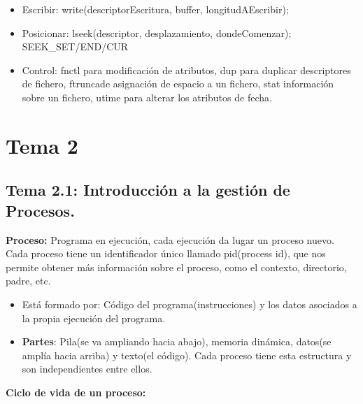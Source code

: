 \documentclass[12pt, twoside, openright]{report} %
\begin{document}
\begin{itemize}
\begin{itemize}
  \item Escribir: write(descriptorEscritura, buffer, longitudAEscribir);
    
  \item Posicionar: lseek(descriptor, desplazamiento, dondeComenzar);
    SEEK\_SET/END/CUR
    
  \item Control: fnctl para modificación de atributos, dup para duplicar
    descriptores de fichero, ftruncade asignación de espacio a un
    fichero, stat información sobre un fichero, utime para alterar los
    atributos de fecha.
    
  \end{itemize}
\end{itemize}

\chapter{Tema 2}
\section{Tema 2.1: Introducción a la gestión de Procesos.}

\textbf{Proceso:} Programa en ejecución, cada ejecución da lugar un
  proceso nuevo. Cada proceso tiene un identificador único llamado
  pid(process id), que nos permite obtener más información sobre el
  proceso, como el contexto, directorio, padre, etc.
  

  \begin{itemize}
  \item Está formado por: Código del programa(instrucciones) y los datos
    asociados a la propia ejecución del programa.
    
  \item \textbf{Partes}: Pila(se va ampliando hacia abajo), memoria
    dinámica, datos(se amplía hacia arriba) y texto(el código). Cada
    proceso tiene esta estructura y son independientes entre ellos.
    
  \end{itemize}
\textbf{Ciclo de vida de un proceso:}
  
\end{document}
